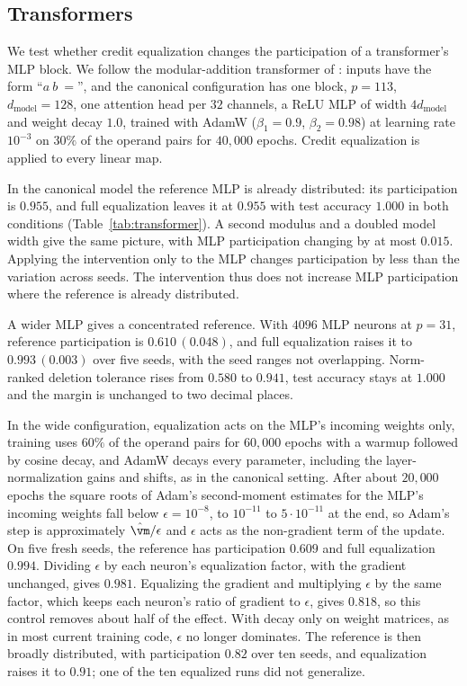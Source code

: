 \documentclass{article} %
\begin{document}
\subsection{Transformers}
\label{app:transformer}
We test whether credit equalization changes the participation of a transformer's MLP block. We follow the modular-addition transformer of \citet{nanda2023progress}: inputs have the form ``$a\ b\ =$'', and the canonical configuration has one block, $p = 113$, $d_{\text{model}} = 128$, one attention head per $32$ channels, a ReLU MLP of width $4 d_{\text{model}}$ and weight decay $1.0$, trained with AdamW ($\beta_1 = 0.9$, $\beta_2 = 0.98$) at learning rate $10^{-3}$ on $30\%$ of the operand pairs for $40{,}000$ epochs. Credit equalization is applied to every linear map.

In the canonical model the reference MLP is already distributed: its participation is $0.955$, and full equalization leaves it at $0.955$ with test accuracy $1.000$ in both conditions (Table~\ref{tab:transformer}). A second modulus and a doubled model width give the same picture, with MLP participation changing by at most $0.015$. Applying the intervention only to the MLP changes participation by less than the variation across seeds. The intervention thus does not increase MLP participation where the reference is already distributed.

A wider MLP gives a concentrated reference. With $4096$ MLP neurons at $p = 31$, reference participation is $0.610\,(0.048)$, and full equalization raises it to $0.993\,(0.003)$ over five seeds, with the seed ranges not overlapping. Norm-ranked deletion tolerance rises from $0.580$ to $0.941$, test accuracy stays at $1.000$ and the margin is unchanged to two decimal places.

In the wide configuration, equalization acts on the MLP's incoming weights only, training uses $60\%$ of the operand pairs for $60{,}000$ epochs with a warmup followed by cosine decay, and AdamW decays every parameter, including the layer-normalization gains and shifts, as in the canonical setting. After about $20{,}000$ epochs the square roots of Adam's second-moment estimates for the MLP's incoming weights fall below $\epsilon = 10^{-8}$, to $10^{-11}$ to $5 \cdot 10^{-11}$ at the end, so Adam's step is approximately $\hat{\vm}/\epsilon$ and $\epsilon$ acts as the non-gradient term of the update. On five fresh seeds, the reference has participation $0.609$ and full equalization $0.994$. Dividing $\epsilon$ by each neuron's equalization factor, with the gradient unchanged, gives $0.981$. Equalizing the gradient and multiplying $\epsilon$ by the same factor, which keeps each neuron's ratio of gradient to $\epsilon$, gives $0.818$, so this control removes about half of the effect. With decay only on weight matrices, as in most current training code, $\epsilon$ no longer dominates. The reference is then broadly distributed, with participation $0.82$ over ten seeds, and equalization raises it to $0.91$; one of the ten equalized runs did not generalize.
\end{document}
